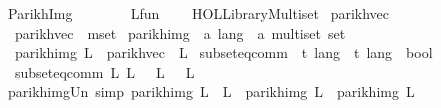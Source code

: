 %
\begin{isabellebody}%
%
%
\isadelimtheory
%
\endisadelimtheory
%
\isatagtheory
{}\isamarkupfalse%
\ Parikh{\isacharunderscore}{\kern0pt}Img\isanewline
\ \ \ \isanewline
\ \ \ \ {\isachardoublequoteopen}Lfun{\isachardoublequoteclose}\isanewline
\ \ \ \ {\isachardoublequoteopen}HOL{\isacharminus}{\kern0pt}Library{\isachardot}{\kern0pt}Multiset{\isachardoublequoteclose}\isanewline
{}%
\endisatagtheory
{\isafoldtheory}%
%
\isadelimtheory
%
\endisadelimtheory
%
\isadelimdocument
%
\endisadelimdocument
%
\isatagdocument
%
\isamarkuptrue%
%
\endisatagdocument
{\isafolddocument}%
%
\isadelimdocument
%
\endisadelimdocument
{}\isamarkupfalse%
\ parikh{\isacharunderscore}{\kern0pt}vec\ \isanewline
\ \ {\isachardoublequoteopen}parikh{\isacharunderscore}{\kern0pt}vec\ {\isasymequiv}\ mset{\isachardoublequoteclose}\isanewline
\isanewline
\isanewline
{}\isamarkupfalse%
\ parikh{\isacharunderscore}{\kern0pt}img\ {\isacharcolon}{\kern0pt}{\isacharcolon}{\kern0pt}\ {\isachardoublequoteopen}{\isacharprime}{\kern0pt}a\ lang\ {\isasymRightarrow}\ {\isacharprime}{\kern0pt}a\ multiset\ set{\isachardoublequoteclose}\ {\isacharparenleft}{\kern0pt}{\isachardoublequoteopen}{\isasymPsi}{\isachardoublequoteclose}{\isacharparenright}{\kern0pt}\ \isanewline
\ \ {\isachardoublequoteopen}parikh{\isacharunderscore}{\kern0pt}img\ L\ {\isasymequiv}\ parikh{\isacharunderscore}{\kern0pt}vec\ {\isacharbackquote}{\kern0pt}\ L{\isachardoublequoteclose}\isanewline
\isanewline
\isanewline
\isanewline
{}\isamarkupfalse%
\ subseteq{\isacharunderscore}{\kern0pt}comm\ {\isacharcolon}{\kern0pt}{\isacharcolon}{\kern0pt}\ {\isachardoublequoteopen}{\isacharprime}{\kern0pt}t\ lang\ {\isasymRightarrow}\ {\isacharprime}{\kern0pt}t\ lang\ {\isasymRightarrow}\ bool{\isachardoublequoteclose}\ \isanewline
\ \ {\isachardoublequoteopen}subseteq{\isacharunderscore}{\kern0pt}comm\ L{}\ L{}\ {\isasymequiv}\ {\isasymPsi}\ L{}\ {\isasymsubseteq}\ {\isasymPsi}\ L{}{\isachardoublequoteclose}\isanewline
\isanewline
\isanewline
{}\isamarkupfalse%
\ parikh{\isacharunderscore}{\kern0pt}img{\isacharunderscore}{\kern0pt}Un\ {\isacharbrackleft}{\kern0pt}simp{\isacharbrackright}{\kern0pt}{\isacharcolon}{\kern0pt}\ {\isachardoublequoteopen}parikh{\isacharunderscore}{\kern0pt}img\ {\isacharparenleft}{\kern0pt}L{}\ {\isasymunion}\ L{}{\isacharparenright}{\kern0pt}\ {\isacharequal}{\kern0pt}\ parikh{\isacharunderscore}{\kern0pt}img\ L{}\ {\isasymunion}\ parikh{\isacharunderscore}{\kern0pt}img\ L{}{\isachardoublequoteclose}\isanewline

\end{isabellebody}
